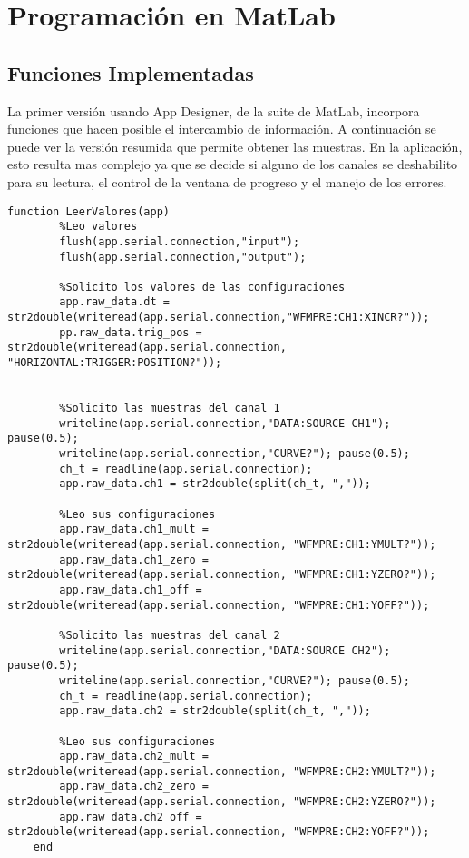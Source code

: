 \chapter{Programación en MatLab}
\section{Funciones Implementadas}
La primer versión usando App Designer, de la suite de MatLab, incorpora funciones que hacen posible el intercambio de información. A continuación se puede ver la versión resumida que permite obtener las muestras. En la aplicación, esto resulta mas complejo ya que se decide si alguno de los canales se deshabilito para su lectura, el control de la ventana de progreso y el manejo de los errores.


\begin{lstlisting}[style=Matlab]
	function LeerValores(app)
		%Leo valores
		flush(app.serial.connection,"input");
		flush(app.serial.connection,"output");
		
		%Solicito los valores de las configuraciones
		app.raw_data.dt = str2double(writeread(app.serial.connection,"WFMPRE:CH1:XINCR?"));
		pp.raw_data.trig_pos = str2double(writeread(app.serial.connection, "HORIZONTAL:TRIGGER:POSITION?"));

		
		%Solicito las muestras del canal 1
		writeline(app.serial.connection,"DATA:SOURCE CH1"); pause(0.5);
		writeline(app.serial.connection,"CURVE?"); pause(0.5);
		ch_t = readline(app.serial.connection);
		app.raw_data.ch1 = str2double(split(ch_t, ","));
		
		%Leo sus configuraciones
		app.raw_data.ch1_mult = str2double(writeread(app.serial.connection, "WFMPRE:CH1:YMULT?"));
		app.raw_data.ch1_zero = str2double(writeread(app.serial.connection, "WFMPRE:CH1:YZERO?"));
		app.raw_data.ch1_off = str2double(writeread(app.serial.connection, "WFMPRE:CH1:YOFF?")); 
		
		%Solicito las muestras del canal 2
		writeline(app.serial.connection,"DATA:SOURCE CH2"); pause(0.5);
		writeline(app.serial.connection,"CURVE?"); pause(0.5);
		ch_t = readline(app.serial.connection);
		app.raw_data.ch2 = str2double(split(ch_t, ","));
		
		%Leo sus configuraciones
		app.raw_data.ch2_mult = str2double(writeread(app.serial.connection, "WFMPRE:CH2:YMULT?"));
		app.raw_data.ch2_zero = str2double(writeread(app.serial.connection, "WFMPRE:CH2:YZERO?"));
		app.raw_data.ch2_off = str2double(writeread(app.serial.connection, "WFMPRE:CH2:YOFF?"));
	end
\end{lstlisting}


